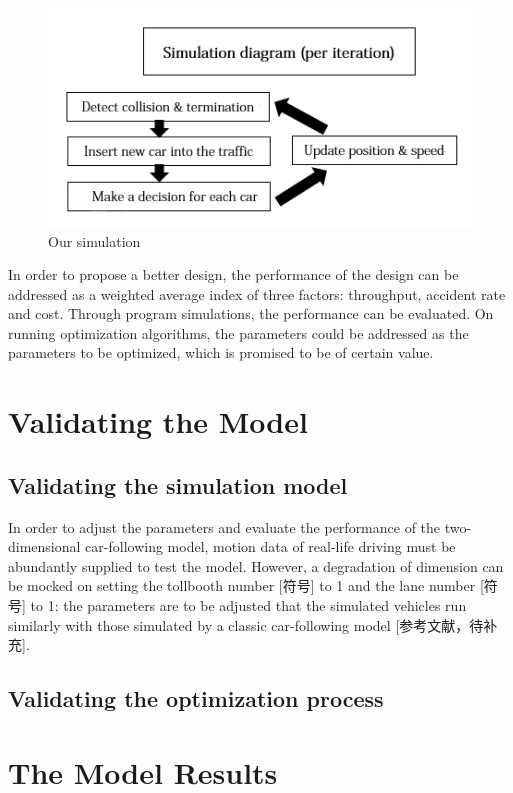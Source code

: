 \documentclass{mcmthesis}
\begin{document}
\begin{figure}[htbp]
	\small 
	\centering
	\caption{Our simulation}
	\includegraphics{simulation.jpg}
\end{figure}


In order to propose a better design, the performance of the design can be addressed as a weighted average index of three factors: throughput, accident rate and cost. Through program simulations, the performance can be evaluated. On running optimization algorithms, the parameters could be addressed as the parameters to be optimized, which is promised to be of certain value.



\section{Validating the Model}

\subsection{Validating the simulation model}

In order to adjust the parameters and evaluate the performance of the two-dimensional car-following model, motion data of real-life driving must be abundantly supplied to test the model. However, a degradation of dimension can be mocked on setting the tollbooth number [符号] to 1 and the lane number [符号] to 1: the parameters are to be adjusted that the simulated vehicles run similarly with those simulated by a classic car-following model [参考文献，待补充].

\subsection{Validating the optimization process}



\section{The Model Results}
\end{document}
